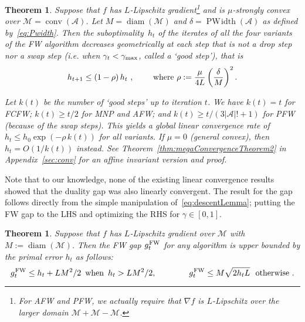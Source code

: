 \documentclass{article} %
\newtheorem{theorem}[definition]{Theorem}
\DeclareMathOperator*{\conv}{conv}
\DeclareMathOperator{\diam}{diam}
\newcommand{\domain}{\mathcal{M}} %
\newcommand{\stepsize}{\gamma}
\newcommand{\stepmax}{\stepsize_{\textnormal{\scriptsize max}}} %
\newcommand{\FW}{{\hspace{0.05em}\textnormal{FW}}}
\newcommand{\Vertices}{\mathcal{A}} %
\newcommand{\PWidth}{\mathop{PW\!idth}}
\newcommand{\0}{\mathbf{0}} %
\begin{document}
\begin{theorem}\label{thm:megaConvergenceTheorem}
Suppose that $f$ has $L$-Lipschitz gradient\footnote{For AFW and PFW, we
actually require that $\nabla f$ is $L$-Lipschitz over the larger
domain $\domain + \domain - \domain$.} and is $\mu$-strongly convex over
$\domain=\conv(\Vertices)$. Let $M=\diam(\domain)$ and $\delta =
\PWidth(\Vertices)$ as defined by~\eqref{eq:Pwidth}.
%
Then the suboptimality~$h_t$ of the iterates of all the four variants of the FW algorithm %
%
%
%
%
%
decreases geometrically at each step that is not a drop step nor a swap step
(i.e. when $\stepsize_t < \stepmax$, called a `good step'), that is\vspace{-1mm}
\[
h_{t+1} \leq \left(1-\rho\right) h_t \ , \quad\quad \text{ where } \rho :=
\frac{\mu}{4L}\left(\frac{\delta}{M}\right)^2. \vspace{-3mm}
\]

%
%
Let $k(t)$ be the number of `good steps' up to iteration $t$.
We have $k(t) = t$ for FCFW; $k(t) \geq t/2$ for
MNP and AFW; and $k(t) \geq t/(3|\Vertices|!+1)$ for PFW (because of the swap steps).
This yields a global linear convergence rate of $h_t \leq h_0 \exp(-
\rho \, k(t))$ for all variants. If $\mu=0$ (general convex),
then $h_t = O(1/k(t))$ instead. See Theorem~\ref{thm:megaConvergenceTheorem2} in Appendix~\ref{sec:conv} for an affine invariant version and proof.
\vspace{-1mm}
\end{theorem}

Note that to our knowledge, none of the existing linear convergence results showed that the duality gap was also linearly convergent. The result for the gap follows directly from the simple manipulation of~\eqref{eq:descentLemma}; putting the FW gap to the LHS
and optimizing the RHS for $\stepsize \in [0,1]$.

\begin{theorem}\label{thm:gapTheorem}
Suppose that $f$ has $L$-Lipschitz gradient over $\domain$ with $M :=
\diam(\domain)$. Then the FW gap $g_t^\FW$ for \emph{any} algorithm is upper
bounded by the primal error $h_t$ as follows:
\begin{equation}
g_t^\FW \leq h_t + LM^2/2 \,\textnormal{ when }\, h_t > LM^2/2, 
\quad\quad\quad\quad  g_t^\FW \leq M \sqrt{2 h_t L} \,\,\textnormal{
otherwise }.
%
\end{equation}
\end{theorem}
%


%
%
%
\end{document}
